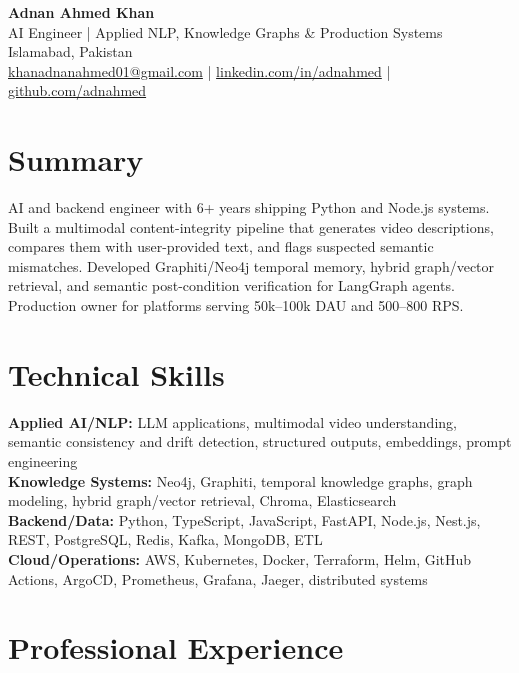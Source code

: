 \documentclass[10pt,letterpaper]{article}
\begin{document}
\fontsize{9.25}{10.55}\selectfont

\begin{center}
  {\Large\bfseries Adnan Ahmed Khan}\\[0.12em]
  {\normalsize AI Engineer | Applied NLP, Knowledge Graphs \& Production Systems}\\[0.15em]
  Islamabad, Pakistan\\[0.15em]
  \href{mailto:khanadnanahmed01@gmail.com}
       {khanadnanahmed01@gmail.com}
  \quad|\quad
  \href{https://linkedin.com/in/adnahmed}
       {linkedin.com/in/adnahmed}
  \quad|\quad
  \href{https://github.com/adnahmed}
       {github.com/adnahmed}
\end{center}

\section*{Summary}
AI and backend engineer with 6+ years shipping Python and Node.js systems.
Built a multimodal content-integrity pipeline that generates video
descriptions, compares them with user-provided text, and flags suspected
semantic mismatches. Developed Graphiti/Neo4j temporal memory, hybrid
graph/vector retrieval, and semantic post-condition verification for LangGraph
agents. Production owner for platforms serving 50k--100k DAU and 500--800 RPS.

\section*{Technical Skills}
\textbf{Applied AI/NLP:}
LLM applications, multimodal video understanding, semantic consistency and
drift detection, structured outputs, embeddings, prompt engineering\\
\textbf{Knowledge Systems:}
Neo4j, Graphiti, temporal knowledge graphs, graph modeling, hybrid graph/vector
retrieval, Chroma, Elasticsearch\\
\textbf{Backend/Data:}
Python, TypeScript, JavaScript, FastAPI, Node.js, Nest.js, REST, PostgreSQL,
Redis, Kafka, MongoDB, ETL\\
\textbf{Cloud/Operations:}
AWS, Kubernetes, Docker, Terraform, Helm, GitHub Actions, ArgoCD, Prometheus,
Grafana, Jaeger, distributed systems

\section*{Professional Experience}
\end{document}
